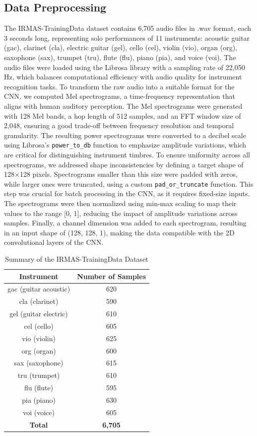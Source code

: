 \documentclass[conference]{IEEEtran}
\begin{document}
\subsection{Data Preprocessing}
The IRMAS-TrainingData dataset contains 6,705 audio files in .wav format, each 3 seconds long, representing solo performances of 11 instruments: acoustic guitar (gac), clarinet (cla), electric guitar (gel), cello (cel), violin (vio), organ (org), saxophone (sax), trumpet (tru), flute (flu), piano (pia), and voice (voi). The audio files were loaded using the Librosa library with a sampling rate of 22,050 Hz, which balances computational efficiency with audio quality for instrument recognition tasks. To transform the raw audio into a suitable format for the CNN, we computed Mel spectrograms, a time-frequency representation that aligns with human auditory perception. The Mel spectrograms were generated with 128 Mel bands, a hop length of 512 samples, and an FFT window size of 2,048, ensuring a good trade-off between frequency resolution and temporal granularity. The resulting power spectrograms were converted to a decibel scale using Librosa’s \texttt{power\_to\_db} function to emphasize amplitude variations, which are critical for distinguishing instrument timbres.
To ensure uniformity across all spectrograms, we addressed shape inconsistencies by defining a target shape of 128$\times$128 pixels. Spectrograms smaller than this size were padded with zeros, while larger ones were truncated, using a custom \texttt{pad\_or\_truncate} function. This step was crucial for batch processing in the CNN, as it requires fixed-size inputs. The spectrograms were then normalized using min-max scaling to map their values to the range [0, 1], reducing the impact of amplitude variations across samples. Finally, a channel dimension was added to each spectrogram, resulting in an input shape of (128, 128, 1), making the data compatible with the 2D convolutional layers of the CNN. \\[3pt]
\begin{table}[h]
\centering
\caption{Summary of the IRMAS-TrainingData Dataset}
\label{tab:dataset_summary}
\begin{tabular}{|c|c|}
\hline
\textbf{Instrument} & \textbf{Number of Samples} \\ \hline
gac (guitar acoustic) & 620 \\ \hline
cla (clarinet) & 590 \\ \hline
gel (guitar electric) & 610 \\ \hline
cel (cello) & 605 \\ \hline
vio (violin) & 625 \\ \hline
org (organ) & 600 \\ \hline
sax (saxophone) & 615 \\ \hline
tru (trumpet) & 610 \\ \hline
flu (flute) & 595 \\ \hline
pia (piano) & 630 \\ \hline
voi (voice) & 605 \\ \hline
\textbf{Total} & \textbf{6,705} \\ \hline
\end{tabular}
\end{table}
\end{document}
